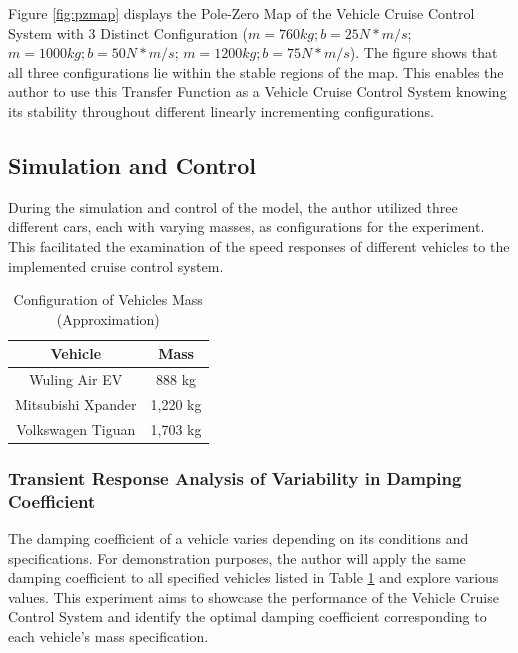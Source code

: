\documentclass{article}
\begin{document}
Figure \ref{fig:pzmap} displays the Pole-Zero Map of the Vehicle Cruise Control System with 3 Distinct Configuration ($m=760 kg;b=25 N*m/s$; $m=1000 kg;b=50 N*m/s$; $m=1200 kg;b=75 N*m/s$). The figure shows that all three configurations lie within the stable regions of the map. This enables the author to use this Transfer Function as a Vehicle Cruise Control System knowing its stability throughout different linearly incrementing configurations.

\subsection{Simulation and Control}

During the simulation and control of the model, the author utilized three different cars, each with varying masses, as configurations for the experiment. This facilitated the examination of the speed responses of different vehicles to the implemented cruise control system.

\begin{table}[H]
    \centering
    \begin{tabular}{c|c}
        Vehicle & Mass \\
        \hline
        Wuling Air EV & 888 kg \\
        Mitsubishi Xpander & 1,220 kg \\
        Volkswagen Tiguan & 1,703 kg \\
    \end{tabular}
    \caption{Configuration of Vehicles Mass (Approximation)}
    \label{tab:mass}
\end{table}

\subsubsection{Transient Response Analysis of Variability in Damping Coefficient}

The damping coefficient of a vehicle varies depending on its conditions and specifications. For demonstration purposes, the author will apply the same damping coefficient to all specified vehicles listed in Table \ref{tab:mass} and explore various values. This experiment aims to showcase the performance of the Vehicle Cruise Control System and identify the optimal damping coefficient corresponding to each vehicle's mass specification.
\end{document}
